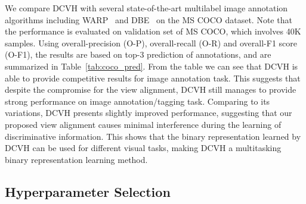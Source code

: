 \documentclass[10pt,twocolumn,letterpaper]{article}
\begin{document}
We compare DCVH with several state-of-the-art multilabel image annotation algorithms including WARP~\cite{warp} and DBE~\cite{dbe} on the MS COCO dataset. Note that the performance is evaluated on validation set of MS COCO, which involves 40K samples. Using overall-precision (O-P), overall-recall (O-R) and overall-F1 score (O-F1), the results are based on top-$3$ prediction of annotations, and are summarized in Table~\ref{tab:coco_pred}. From the table we can see that DCVH is able to provide competitive results for image annotation task. This suggests that despite the compromise for the view alignment, DCVH still manages to provide strong performance on image annotation/tagging task. Comparing to its variations, DCVH presents slightly improved performance, suggesting that our proposed view alignment causes minimal interference during the learning of discriminative information. This shows that the binary representation learned by DCVH can be used for different visual tasks, making DCVH a multitasking binary representation learning method.
\begin{table}[!htbp]
\centering
{}
\caption{Performance comparison on MS COCO for image annotation task, compared on top-3 predictions.}
\label{tab:coco_pred}
\end{table}

\subsection{Hyperparameter Selection}\label{sec:hyper}
\end{document}
